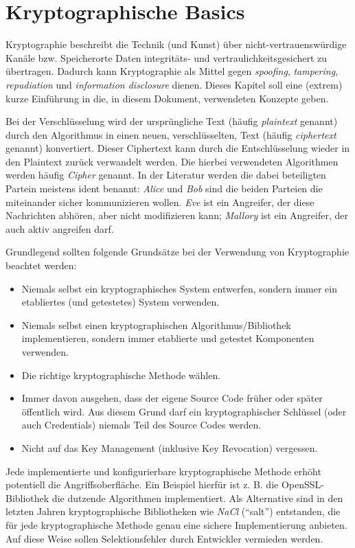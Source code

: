 \chapter{Kryptographische Basics}

Kryptographie beschreibt die Technik (und Kunst) über nicht-vertrauenswürdige Kanäle bzw. Speicherorte Daten integritäts- und vertraulichkeitsgesichert zu übertragen. Dadurch kann Kryptographie als Mittel gegen \textit{spoofing}, \textit{tampering}, \textit{repudiation} und \textit{information disclosure} dienen. Dieses Kapitel soll eine (extrem) kurze Einführung in die, in diesem Dokument, verwendeten Konzepte geben.

Bei der Verschlüsselung wird der ursprüngliche Text (häufig \textit{plaintext} genannt) durch den Algorithmus in einen neuen, verschlüsselten, Text (häufig \textit{ciphertext} genannt) konvertiert. Dieser Ciphertext kann durch die Entschlüsselung wieder in den Plaintext zurück verwandelt werden. Die hierbei verwendeten Algorithmen werden häufig \textit{Cipher} genannt. In der Literatur werden die dabei beteiligten Partein meistens ident benannt: \textit{Alice} und \textit{Bob} sind die beiden Parteien die miteinander sicher kommunizieren wollen. \textit{Eve} ist ein Angreifer, der diese Nachrichten abhören, aber nicht modifizieren kann; \textit{Mallory} ist ein Angreifer, der auch aktiv angreifen darf.

Grundlegend sollten folgende Grundsätze bei der Verwendung von Kryptographie beachtet werden:

\begin{itemize}
	\item Niemals selbst ein kryptographisches System entwerfen, sondern immer ein etabliertes (und getestetes) System verwenden.
	\item Niemals selbst einen kryptographischen Algorithmus/Bibliothek implementieren, sondern immer etablierte und getestet Komponenten verwenden.
	\item Die richtige kryptographische Methode wählen.
	\item Immer davon ausgehen, dass der eigene Source Code früher oder später öffentlich wird. Aus diesem Grund darf ein kryptographischer Schlüssel (oder auch Credentials) niemals Teil des Source Codes werden.
	\item Nicht auf das Key Management (inklusive Key Revocation) vergessen.
\end{itemize}

Jede implementierte und konfigurierbare kryptographische Methode erhöht potentiell die Angriffsoberfläche. Ein Beispiel hierfür ist z. B. die OpenSSL-Bibliothek die dutzende Algorithmen implementiert. Als Alternative sind in den letzten Jahren kryptographische Bibliotheken wie \textit{NaCl} (``salt'') entstanden, die für jede kryptographische Methode genau eine sichere Implementierung anbieten. Auf diese Weise sollen Selektionsfehler durch Entwickler vermieden werden.

